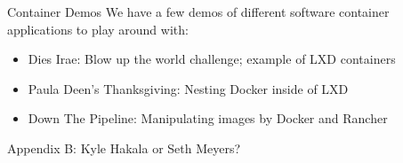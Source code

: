 \documentclass[xcolor=dvipsnames,aspectratio=1610]{beamer}
\begin{document}
  \begin{frame}{Container Demos}
      We have a few demos of different software container applications to play around with: \newline
      \begin{itemize}
        \setlength\itemsep{1.6em}
        \item Dies Irae: Blow up the world challenge; example of LXD containers
        \item Paula Deen's Thanksgiving: Nesting Docker inside of LXD
        \item Down The Pipeline: Manipulating images by Docker and Rancher
      \end{itemize}

  \end{frame}

  \begin{frame}{Appendix B: Kyle Hakala or Seth Meyers?}


\end{frame}
\end{document}
